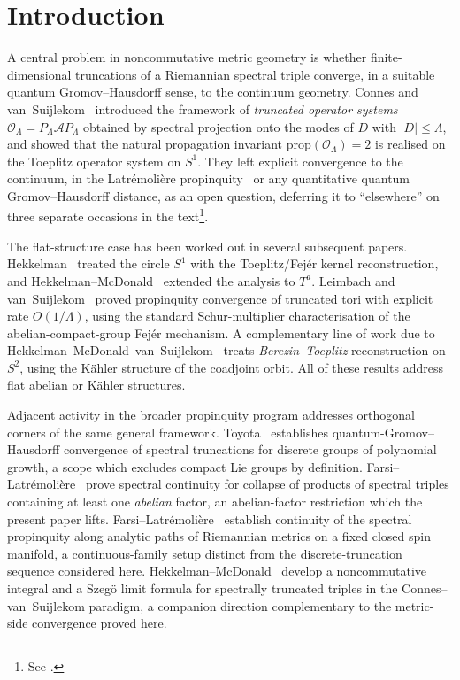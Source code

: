 \documentclass[11pt,a4paper]{article}
\theoremstyle{plain}
\theoremstyle{definition}
\newcommand{\Op}{\mathcal{O}}
\begin{document}
\section{Introduction}\label{sec:intro}

A central problem in noncommutative metric geometry is whether
finite-dimensional truncations of a Riemannian spectral triple
converge, in a suitable quantum Gromov--Hausdorff sense, to the
continuum geometry. Connes and van~Suijlekom~\cite{connes_vs2021}
introduced the framework of \emph{truncated operator systems}
$\Op_\Lambda = P_\Lambda \mathcal{A} P_\Lambda$ obtained by spectral
projection onto the modes of $D$ with $|D| \le \Lambda$, and showed
that the natural propagation invariant $\mathrm{prop}(\Op_\Lambda) = 2$
is realised on the Toeplitz operator system on $S^1$. They left
explicit convergence to the continuum, in the Latr\'emoli\`ere
propinquity~\cite{latremoliere2018, latremoliere2016} or any
quantitative quantum Gromov--Hausdorff distance, as an open question,
deferring it to ``elsewhere'' on three separate occasions in the
text\footnote{See \cite[lines~220--221, 1101, 2616--2618 of
\texttt{arXiv:2004.14115v2}]{connes_vs2021}.}.

The flat-structure case has been worked out in several subsequent
papers. Hekkelman~\cite{hekkelman2022} treated the circle $S^1$
with the Toeplitz/Fej\'er kernel reconstruction, and
Hekkelman--McDonald~\cite{hekkelman_mcdonald2024} extended the
analysis to $T^d$. Leimbach and van~Suijlekom~\cite{leimbach_vs2024}
proved propinquity convergence of truncated tori with explicit rate
$O(1/\Lambda)$, using the standard
Schur-multiplier characterisation of the abelian-compact-group Fej\'er
mechanism. A complementary line of work due to
Hekkelman--McDonald--van~Suijlekom~\cite{ucp_maps_2024} treats
\emph{Berezin--Toeplitz} reconstruction on $S^2$, using the K\"ahler
structure of the coadjoint orbit. All of these results address flat
abelian or K\"ahler structures.

Adjacent activity in the broader propinquity program addresses
orthogonal corners of the same general framework.
Toyota~\cite{toyota2023} establishes quantum-Gromov--Hausdorff
convergence of spectral truncations for discrete groups of
polynomial growth, a scope which excludes compact Lie groups by
definition. Farsi--Latr\'emoli\`ere~\cite{farsi_latremoliere2024}
prove spectral continuity for collapse of products of spectral
triples containing at least one \emph{abelian} factor, an
abelian-factor restriction which the present paper lifts.
Farsi--Latr\'emoli\`ere~\cite{farsi_latremoliere2025} establish
continuity of the spectral propinquity along analytic paths of
Riemannian metrics on a fixed closed spin manifold, a
continuous-family setup distinct from the discrete-truncation
sequence considered here. Hekkelman--McDonald~\cite{hekkelman_mcdonald2024b}
develop a noncommutative integral and a Szeg\"o limit formula for
spectrally truncated triples in the Connes--van~Suijlekom paradigm,
a companion direction complementary to the metric-side convergence
proved here.
\end{document}
